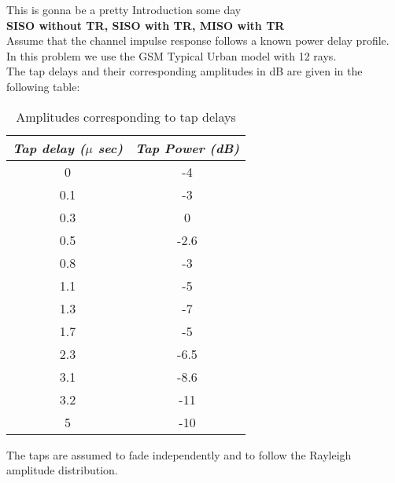 This is gonna be a pretty Introduction some day\\
\textbf{SISO without TR, SISO with TR, MISO with TR}\\

Assume that the channel impulse response follows a known power delay profile. In this problem we use the GSM Typical Urban model with 12 rays.\\ The tap delays and their corresponding amplitudes in dB are given in the following table: 
\begin{table}[ht]
\centering
\begin{tabular}{c|c}
{\em Tap delay ($\mu$ sec)\/} & {\em Tap Power (dB)\/}  \\
\hline 0 & -4  \\
0.1 & -3 \\
0.3 & 0 \\
0.5 & -2.6\\
0.8 & -3\\
1.1 & -5\\
1.3 & -7\\
1.7 & -5\\
2.3 & -6.5\\
3.1 & -8.6\\
3.2 & -11\\
5 & -10
\end{tabular}\label{Test}
\caption{Amplitudes corresponding to tap delays}
\label{tab:1_intro}
\end{table} 

The taps are assumed to fade independently and to follow the Rayleigh amplitude distribution. 